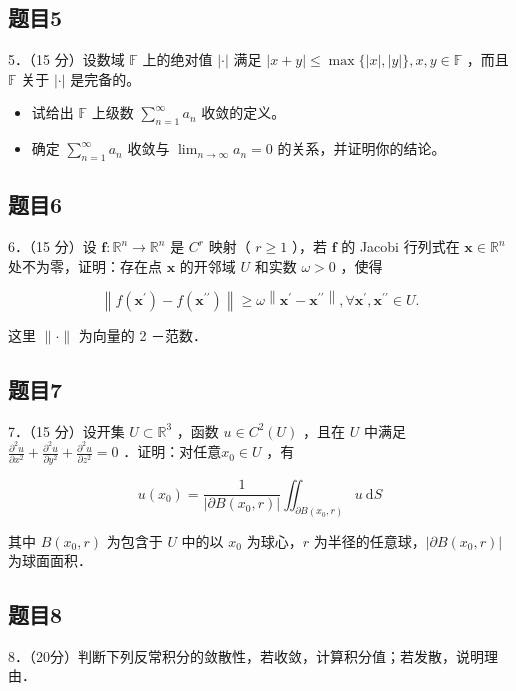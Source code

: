 \documentclass{article}
\begin{document}
\subsection{题目5}
5．（15 分）设数域 \(\mathbb{F}\) 上的绝对值 \(|\cdot|\) 满足 \(|x+y| \leq \max \{|x|,|y|\}, x, y \in \mathbb{F}\) ，而且 \(\mathbb{F}\) 关于 \(|\cdot|\) 是完备的。

\begin{itemize}
  \item[（1）] 试给出 \(\mathbb{F}\) 上级数 \(\sum_{n=1}^{\infty} a_{n}\) 收敛的定义。
  \item[（2）] 确定 \(\sum_{n=1}^{\infty} a_{n}\) 收敛与 \(\lim _{n \rightarrow \infty} a_{n}=0\) 的关系，并证明你的结论。
\end{itemize}

\subsection{题目6}
6．（15 分）设 \(\mathbf{f}: \mathbb{R}^{n} \rightarrow \mathbb{R}^{n}\) 是 \(C^{r}\) 映射（ \(r \geq 1\) ），若 \(\mathbf{f}\) 的 Jacobi 行列式在 \(\mathbf{x} \in \mathbb{R}^{n}\) 处不为零，证明：存在点 \(\mathbf{x}\) 的开邻域 \(U\) 和实数 \(\omega>0\) ，使得

\[
\left\|f\left(\mathbf{x}^{\prime}\right)-f\left(\mathbf{x}^{\prime \prime}\right)\right\| \geq \omega\left\|\mathbf{x}^{\prime}-\mathbf{x}^{\prime \prime}\right\|, \forall \mathbf{x}^{\prime}, \mathbf{x}^{\prime \prime} \in U .
\]

这里 \(\|\cdot\|\) 为向量的 2 －范数．

\subsection{题目7}
7．（15 分）设开集 \(U \subset \mathbb{R}^{3}\) ，函数 \(u \in C^{2}(U)\) ，且在 \(U\) 中满足 \(\frac{\partial^{2} u}{\partial x^{2}}+\frac{\partial^{2} u}{\partial y^{2}}+\frac{\partial^{2} u}{\partial z^{2}}=0\) ．证明：对任意\(x_{0} \in U\) ，有

\[
u\left(x_{0}\right)=\frac{1}{\left|\partial B\left(x_{0}, r\right)\right|} \iint_{\partial B\left(x_{0}, r\right)} u \mathrm{~d} S
\]

其中 \(B\left(x_{0}, r\right)\) 为包含于 \(U\) 中的以 \(x_{0}\) 为球心，\(r\) 为半径的任意球，\(\left|\partial B\left(x_{0}, r\right)\right|\) 为球面面积．

\subsection{题目8}
8．（20分）判断下列反常积分的敛散性，若收敛，计算积分值；若发散，说明理由．
\end{document}
